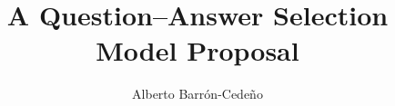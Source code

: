\documentclass{sig-alternate-05-2015}
\begin{document}


%

\title{A Question--Answer Selection Model Proposal}

%
\author{Alberto Barr\'on-Cede\~no}
%


\maketitle
\end{document}
